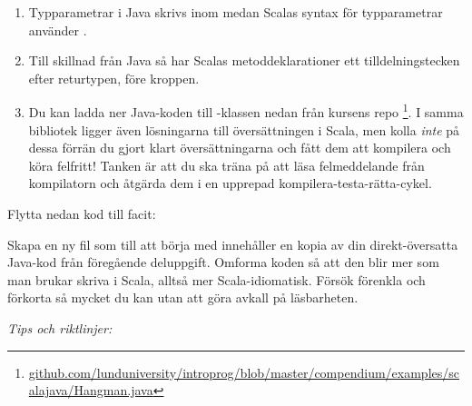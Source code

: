 \begin{enumerate}[noitemsep]
\item Typparametrar i Java skrivs inom \code{<>} medan Scalas syntax för typparametrar använder \code{[]}.

\item Till skillnad från Java så har Scalas metoddeklarationer ett tilldelningstecken \code{=} efter returtypen, före kroppen.

\item Du kan ladda ner Java-koden till -klassen nedan från kursens repo%
\footnote{\href{https://github.com/lunduniversity/introprog/blob/master/compendium/examples/scalajava/Hangman.java}{github.com/lunduniversity/introprog/blob/master/compendium/examples/scalajava/Hangman.java}}. I samma bibliotek ligger även lösningarna till översättningen i Scala, men kolla \emph{inte} på dessa förrän du gjort klart översättningarna och fått dem att kompilera och köra felfritt! Tanken är att du ska träna på att läsa felmeddelande från kompilatorn och åtgärda dem i en upprepad kompilera-testa-rätta-cykel.

\end{enumerate}



\TODO Flytta nedan kod till facit:



\Subtask Skapa en ny fil  som till att börja med innehåller en kopia av din direkt-översatta Java-kod från föregående deluppgift. Omforma koden så att den blir mer som man brukar skriva i Scala, alltså mer Scala-idiomatisk. Försök förenkla och förkorta så mycket du kan utan att göra avkall på läsbarheten.

\emph{Tips och riktlinjer:}


